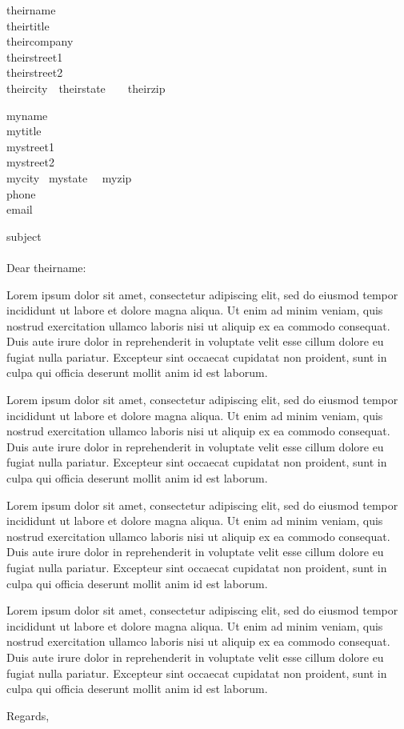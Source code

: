 \documentclass[11pt]{letter}
\date{yyyy-mm-dd}
\begin{document}
\begin{letter}{
theirname \\
theirtitle \\
theircompany \\
theirstreet1 \\
theirstreet2 \\
theircity\ \ theirstate\ \ \ \ theirzip
}

myname \\
mytitle \\
mystreet1 \\
mystreet2 \\
mycity~ mystate~~ myzip \\
phone \\
email

\opening{subject \\ \\ Dear theirname:}

Lorem ipsum dolor sit amet, consectetur adipiscing elit, sed do eiusmod tempor incididunt ut labore et dolore magna aliqua. Ut enim ad minim veniam, quis nostrud exercitation ullamco laboris nisi ut aliquip ex ea commodo consequat. Duis aute irure dolor in reprehenderit in voluptate velit esse cillum dolore eu fugiat nulla pariatur. Excepteur sint occaecat cupidatat non proident, sunt in culpa qui officia deserunt mollit anim id est laborum.

Lorem ipsum dolor sit amet, consectetur adipiscing elit, sed do eiusmod tempor incididunt ut labore et dolore magna aliqua. Ut enim ad minim veniam, quis nostrud exercitation ullamco laboris nisi ut aliquip ex ea commodo consequat. Duis aute irure dolor in reprehenderit in voluptate velit esse cillum dolore eu fugiat nulla pariatur. Excepteur sint occaecat cupidatat non proident, sunt in culpa qui officia deserunt mollit anim id est laborum.

Lorem ipsum dolor sit amet, consectetur adipiscing elit, sed do eiusmod tempor incididunt ut labore et dolore magna aliqua. Ut enim ad minim veniam, quis nostrud exercitation ullamco laboris nisi ut aliquip ex ea commodo consequat. Duis aute irure dolor in reprehenderit in voluptate velit esse cillum dolore eu fugiat nulla pariatur. Excepteur sint occaecat cupidatat non proident, sunt in culpa qui officia deserunt mollit anim id est laborum.

Lorem ipsum dolor sit amet, consectetur adipiscing elit, sed do eiusmod tempor incididunt ut labore et dolore magna aliqua. Ut enim ad minim veniam, quis nostrud exercitation ullamco laboris nisi ut aliquip ex ea commodo consequat. Duis aute irure dolor in reprehenderit in voluptate velit esse cillum dolore eu fugiat nulla pariatur. Excepteur sint occaecat cupidatat non proident, sunt in culpa qui officia deserunt mollit anim id est laborum.

\closing{Regards,}
\end{letter}
\end{document}

